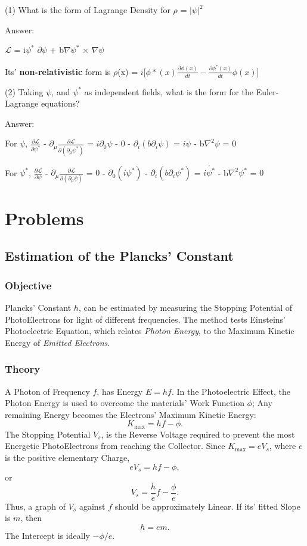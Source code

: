 \documentclass[a4paper, 10pt, onepage]{elegantbook}
\begin{document}
{(1) What is the form of Lagrange Density for $\rho$ = $\lvert \psi \rvert^2$  

Answer:  

$\mathscr{L}$ = i$\psi^{*}$ $\partial \psi$ + b$\nabla \psi^{*}$ $\times$ $\nabla \psi$  

Its' \textbf{non-relativistic} form is $\rho$(x) = $i[\phi*(x) \frac{\partial \phi(x)}{dt} - \frac{\partial 
\phi^*(x)}{dt} \phi(x)$]

(2) Taking $\psi$, and $\psi^{*}$ as independent fields, what is the form for the Euler-Lagrange equations?  

Answer:  

For $\psi$, \quad $\frac{\partial \mathscr{L}}{\partial \psi^{*}}$ - $\partial_\mu \frac{\partial 
\mathscr{L}}{\partial(\partial_\mu \psi^{*})}$ = $i \partial_0 \psi$ - $0$ - $\partial_{i} (b \partial_{i} \psi)$ = $i 
\dot{\psi}$ - b$\nabla^{2} \psi$ = $0$ 

For $\psi^{*}$, \quad $\frac{\partial \mathscr{L}}{\partial \psi}$ - $\partial_\mu \frac{\partial 
\mathscr{L}}{\partial(\partial_\mu \psi)}$ = $0$ - $\partial_0(i \psi^{*})$ - $\partial_{i} (b \partial_{i} \psi^{*})$ 
= $i \dot{\psi^{*}}$ - b$\nabla^{2} \psi^{*}$ = $0$ 

\chapter{Problems}

\section{Estimation of the Plancks' Constant}

\subsection{Objective}

Plancks' Constant \(h\), can be estimated by measuring the Stopping Potential of PhotoElectrons for light of different 
frequencies. The method tests Einsteins' Photoelectric Equation, which relates \emph{Photon Energy}, to the Maximum 
Kinetic Energy of \emph{Emitted Electrons}.

\subsection{Theory}

A Photon of Frequency \(f\), has Energy \(E=hf\). In the Photoelectric Effect, the Photon Energy is used to overcome 
the materials' Work Function \(\phi\); Any remaining Energy becomes the Electrons' Maximum Kinetic Energy:
\[
K_{\max}=hf-\phi.
\]
The Stopping Potential \(V_s\), is the Reverse Voltage required to prevent the most Energetic PhotoElectrons from 
reaching the Collector. Since \(K_{\max}=eV_s\), where \(e\) is the positive elementary Charge,
\[
eV_s=hf-\phi,
\]
or
\[
\boxed{
V_s=\frac{h}{e}f-\frac{\phi}{e}
}.
\]
Thus, a graph of \(V_s\) against \(f\) should be approximately Linear.
If its' fitted Slope is \(m\), then
\[
\boxed{h=em}.
\]
The Intercept is ideally \(-\phi/e\).

}
\end{document}
